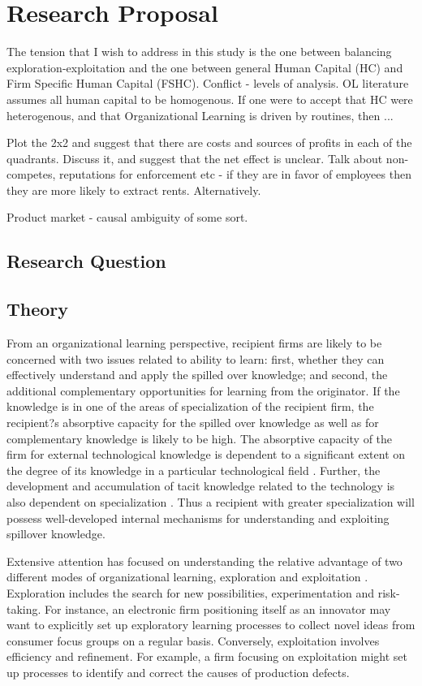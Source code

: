 \documentclass[12pt,letterpaper]{article}
\begin{document}
\section{Research Proposal}
The tension that I wish to address in this study is the one between balancing exploration-exploitation and the one between general Human Capital (HC) and Firm Specific Human Capital (FSHC). Conflict - levels of analysis. OL literature assumes all human capital to be homogenous. If one were to accept that HC were heterogenous, and that Organizational Learning is driven by routines, then ...

Plot the 2x2 and suggest that there are costs and sources of profits in each of the quadrants. Discuss it, and suggest that the net effect is unclear. Talk about non-competes, reputations for enforcement etc - if they are in favor of employees then they are more likely to extract rents. Alternatively.

Product market - causal ambiguity of some sort.

\subsection{Research Question}


\subsection{Theory}
From an organizational learning perspective, recipient firms are likely to be concerned with two issues related to ability to learn: first, whether they can effectively understand and apply the spilled over knowledge; and second, the additional complementary opportunities for learning from the originator. If the knowledge is in one of the areas of specialization of the recipient firm, the recipient?s absorptive capacity \citep{Cohen1990} for the spilled over knowledge as well as for complementary knowledge is likely to be high. The absorptive capacity of the firm for external technological knowledge is dependent to a significant extent on the degree of its knowledge in a particular technological field \citep{Schoenmakers2006}. Further, the development and accumulation of tacit knowledge \citep{Polanyi1966} related to the technology is also dependent on specialization \citep{Enright1991}. Thus a recipient with greater specialization will possess well-developed internal mechanisms for understanding and exploiting spillover knowledge.

Extensive attention has focused on understanding the relative advantage of two different modes of organizational learning, exploration and exploitation \cite{March1991a}. Exploration includes the search for new possibilities, experimentation and risk-taking. For instance, an electronic firm positioning itself as an innovator may want to explicitly set up exploratory learning processes to collect novel ideas from consumer focus groups on a regular basis. Conversely, exploitation involves efficiency and refinement. For example, a firm focusing on exploitation might set up processes to identify and correct the causes of production defects.
\end{document}
